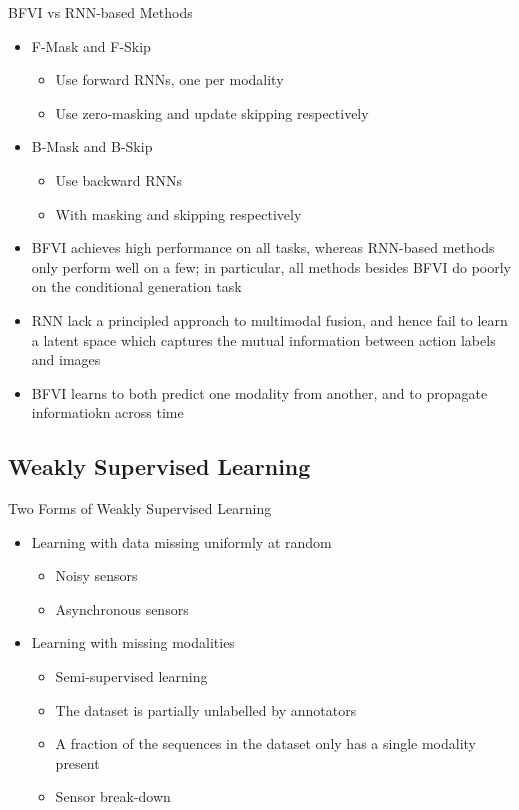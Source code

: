 \documentclass{beamer}
\begin{document}
\begin{frame}{BFVI vs RNN-based Methods}
\begin{itemize}
\item F-Mask and F-Skip
\begin{itemize}
\item Use forward RNNs, one per modality
\item Use zero-masking and update skipping respectively
\end{itemize}
\item B-Mask and B-Skip
\begin{itemize}
\item Use backward RNNs
\item With masking and skipping respectively
\end{itemize}
\item BFVI achieves high performance on all tasks, whereas RNN-based methods only perform well on a few; in particular, all methods besides BFVI do poorly on the conditional generation task
\item RNN lack a principled approach to multimodal fusion, and hence fail to learn a latent space which captures the mutual information between action labels and images
\item BFVI learns to both predict one modality from another, and to propagate informatiokn across time
\end{itemize}
\end{frame}

\subsection{Weakly Supervised Learning}

\begin{frame}{Two Forms of Weakly Supervised Learning}
\begin{itemize}
\item Learning with data missing uniformly at random
\begin{itemize}
\item Noisy sensors
\item Asynchronous sensors
\end{itemize}
\item Learning with missing modalities
\begin{itemize}
\item Semi-supervised learning
\item The dataset is partially unlabelled by annotators
\item A fraction of the sequences in the dataset only has a single modality present
\item Sensor break-down
\end{itemize}
\end{itemize}
\end{frame}
\end{document}
